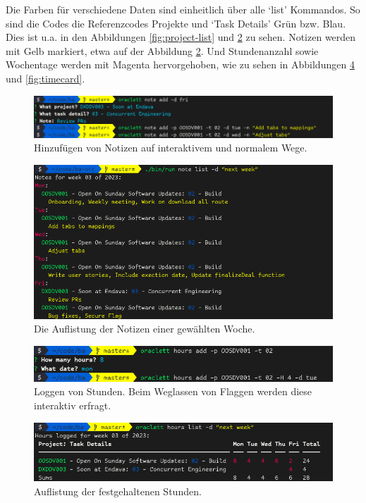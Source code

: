 \documentclass[oneside,bibliography=totocnumbered,BCOR=5mm]{scrbook}
\begin{document}
Die Farben für verschiedene Daten sind einheitlich über alle `list' Kommandos.
So sind die Codes die Referenzcodes Projekte und `Task Details' Grün
bzw. Blau. Dies ist u.a. in den Abbildungen \ref{fig:project-list} und
\ref{fig:note-list} zu sehen. Notizen werden mit Gelb markiert, etwa auf der
Abbildung \ref{fig:note-list}. Und Stundenanzahl sowie Wochentage werden mit
Magenta hervorgehoben, wie zu sehen in Abbildungen \ref{fig:hours-list} und
\ref{fig:timecard}.

\begin{figure}
  \centering
  \includegraphics[scale=0.5]{note-add.png}
  \caption{Hinzufügen von Notizen auf interaktivem und normalem Wege.}
  \label{fig:note-add}
\end{figure}

\begin{figure}
  \centering
  \includegraphics[scale=0.5]{note-list.png}
  \caption{Die Auflistung der Notizen einer gewählten Woche.}
  \label{fig:note-list}
\end{figure}

\begin{figure}
  \centering
  \includegraphics[scale=0.5]{hours-add.png}
  \caption{Loggen von Stunden. Beim Weglassen von Flaggen werden diese interaktiv erfragt.}
  \label{fig:hours-add}
\end{figure}

\begin{figure}
  \centering
  \includegraphics[scale=0.5]{hours-list-real.png}
  \caption{Auflistung der festgehaltenen Stunden.}
  \label{fig:hours-list}
\end{figure}
\end{document}
